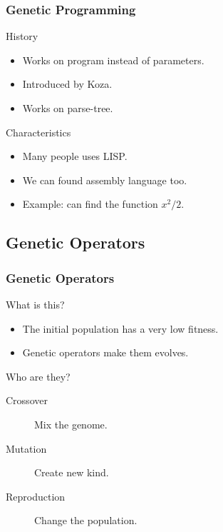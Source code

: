 \begin{frame}
  \frametitle{Genetic Programming}
  \begin{block}{History}
    \begin{itemize}
    \item Works on program instead of parameters.
    \item Introduced by Koza\cite{Koza92}.
    \item Works on parse-tree.
    \end{itemize}
  \end{block}

  \begin{block}{Characteristics}
    \begin{itemize}
    \item Many people uses LISP.
    \item We can found assembly language too.
    \item Example: can find the function $x^2/2$.
    \end{itemize}
  \end{block}
\end{frame}

\subsection{Genetic Operators}

\begin{frame}
  \frametitle{Genetic Operators}
  \begin{block}{What is this?}
    \begin{itemize}
    \item The initial population has a very low fitness.
    \item Genetic operators make them evolves.
    \end{itemize}
  \end{block}

  \begin{block}{Who are they?}
    \begin{description}
    \item[Crossover] Mix the genome.
    \item[Mutation] Create new kind.
    \item[Reproduction] Change the population.
    \end{description}
  \end{block}

\end{frame}

